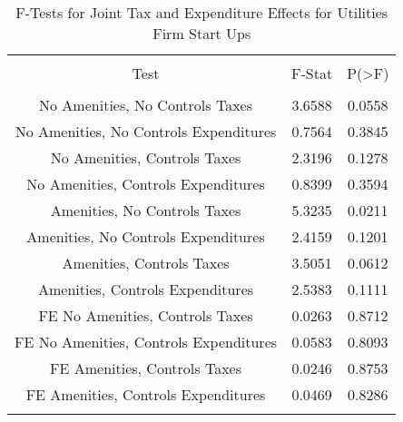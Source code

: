 
\begin{table}[!htbp] \centering 
  \caption{F-Tests for Joint Tax and Expenditure Effects for Utilities Firm Start Ups} 
  \label{22Ftests} 
\begin{tabular}{@{\extracolsep{5pt}} ccc} 
\\[-1.8ex]\hline 
\hline \\[-1.8ex] 
Test & F-Stat & P(\textgreater F) \\ 
\hline \\[-1.8ex] 
No Amenities, No Controls Taxes & 3.6588 & 0.0558 \\ 
No Amenities, No Controls Expenditures & 0.7564 & 0.3845 \\ 
No Amenities, Controls Taxes & 2.3196 & 0.1278 \\ 
No Amenities, Controls Expenditures & 0.8399 & 0.3594 \\ 
Amenities, No Controls Taxes & 5.3235 & 0.0211 \\ 
Amenities, No Controls Expenditures & 2.4159 & 0.1201 \\ 
Amenities, Controls Taxes & 3.5051 & 0.0612 \\ 
Amenities, Controls Expenditures & 2.5383 & 0.1111 \\ 
FE No Amenities, Controls Taxes & 0.0263 & 0.8712 \\ 
FE No Amenities, Controls Expenditures & 0.0583 & 0.8093 \\ 
FE Amenities, Controls Taxes & 0.0246 & 0.8753 \\ 
FE Amenities, Controls Expenditures & 0.0469 & 0.8286 \\ 
\hline \\[-1.8ex] 
\end{tabular} 
\end{table} 
